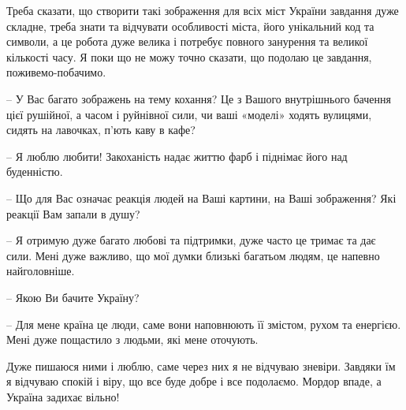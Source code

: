Треба сказати, що створити такі зображення для всіх міст України завдання дуже
складне, треба знати та відчувати особливості міста, його унікальний код та
символи, а це робота дуже велика і потребує повного занурення та великої
кількості часу. Я поки що не можу точно сказати, що подолаю це завдання,
поживемо-побачимо.

– У Вас багато зображень на тему кохання? Це з Вашого внутрішнього бачення цієї
рушійної, а часом і руйнівної сили, чи ваші «моделі» ходять вулицями, сидять на
лавочках, п’ють каву в кафе?

– Я люблю любити! Закоханість надає життю фарб і піднімає його над буденністю.


– Що для Вас означає реакція людей на Ваші картини, на Ваші зображення? Які
реакції Вам запали в душу?

– Я отримую дуже багато любові та підтримки, дуже часто це тримає та дає сили.
Мені дуже важливо, що мої думки близькі багатьом людям, це напевно
найголовніше.


– Якою Ви бачите Україну?

– Для мене країна це люди, саме вони наповнюють її змістом, рухом та енергією.
Мені дуже пощастило з людьми, які мене оточують.

Дуже пишаюся ними і люблю, саме через них я не відчуваю зневіри. Завдяки їм я
відчуваю спокій і віру, що все буде добре і все подолаємо. Мордор впаде, а
Україна задихає вільно!

